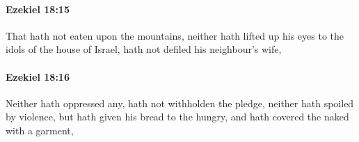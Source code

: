		\paragraph{Ezekiel 18:15} %
			\label{EZEKIEL-18-15}

			That hath not eaten upon the mountains, neither hath lifted up his eyes to the idols of the house of Israel, hath not defiled his neighbour’s wife,


		\paragraph{Ezekiel 18:16} %
			\label{EZEKIEL-18-16}

			Neither hath oppressed any, hath not withholden the pledge, neither hath spoiled by violence, but hath given his bread to the hungry, and hath covered the naked with a garment,



